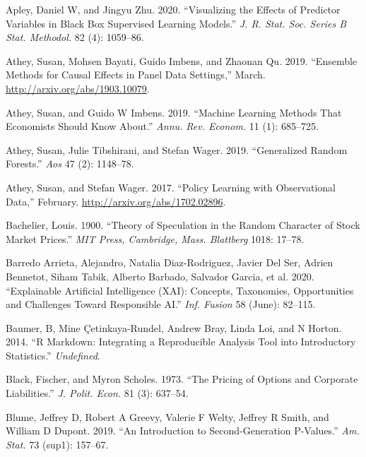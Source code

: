 \documentclass{article}
\begin{document}
\hypertarget{refs}{}
\leavevmode\hypertarget{ref-Apley2020}{}%
Apley, Daniel W, and Jingyu Zhu. 2020. ``Visualizing the Effects of
Predictor Variables in Black Box Supervised Learning Models.'' \emph{J.
R. Stat. Soc. Series B Stat. Methodol.} 82 (4): 1059--86.

\leavevmode\hypertarget{ref-Athey2019b}{}%
Athey, Susan, Mohsen Bayati, Guido Imbens, and Zhaonan Qu. 2019.
``Ensemble Methods for Causal Effects in Panel Data Settings,'' March.
\url{http://arxiv.org/abs/1903.10079}.

\leavevmode\hypertarget{ref-Athey2019a}{}%
Athey, Susan, and Guido W Imbens. 2019. ``Machine Learning Methods That
Economists Should Know About.'' \emph{Annu. Rev. Econom.} 11 (1):
685--725.

\leavevmode\hypertarget{ref-Athey2019c}{}%
Athey, Susan, Julie Tibshirani, and Stefan Wager. 2019. ``Generalized
Random Forests.'' \emph{Aos} 47 (2): 1148--78.

\leavevmode\hypertarget{ref-Athey2017}{}%
Athey, Susan, and Stefan Wager. 2017. ``Policy Learning with
Observational Data,'' February. \url{http://arxiv.org/abs/1702.02896}.

\leavevmode\hypertarget{ref-Bachelier1900}{}%
Bachelier, Louis. 1900. ``Theory of Speculation in the Random Character
of Stock Market Prices.'' \emph{MIT Press, Cambridge, Mass. Blattberg}
1018: 17--78.

\leavevmode\hypertarget{ref-Barredo_Arrieta2020}{}%
Barredo Arrieta, Alejandro, Natalia Diaz-Rodriguez, Javier Del Ser,
Adrien Bennetot, Siham Tabik, Alberto Barbado, Salvador Garcia, et al.
2020. ``Explainable Artificial Intelligence (XAI): Concepts, Taxonomies,
Opportunities and Challenges Toward Responsible AI.'' \emph{Inf. Fusion}
58 (June): 82--115.

\leavevmode\hypertarget{ref-Baumer2014}{}%
Baumer, B, Mine Çetinkaya-Rundel, Andrew Bray, Linda Loi, and N Horton.
2014. ``R Markdown: Integrating a Reproducible Analysis Tool into
Introductory Statistics.'' \emph{Undefined}.

\leavevmode\hypertarget{ref-Black1973}{}%
Black, Fischer, and Myron Scholes. 1973. ``The Pricing of Options and
Corporate Liabilities.'' \emph{J. Polit. Econ.} 81 (3): 637--54.

\leavevmode\hypertarget{ref-Blume2019}{}%
Blume, Jeffrey D, Robert A Greevy, Valerie F Welty, Jeffrey R Smith, and
William D Dupont. 2019. ``An Introduction to Second-Generation
P-Values.'' \emph{Am. Stat.} 73 (sup1): 157--67.
\end{document}
